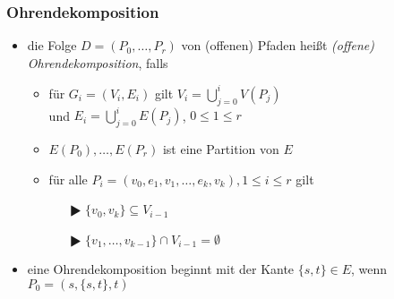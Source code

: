 \subsubsection{Ohrendekomposition}
\begin{minipage}{0.3\textwidth}
	
\end{minipage}
\begin{minipage}{0.65\textwidth}
	\begin{itemize}[itemsep=-1pt]
		\item die Folge $D=(P_0,\dots,P_r)$ von (offenen) Pfaden heißt \textit{(offene) Ohrendekomposition}, falls
			\begin{itemize}[itemsep=-1pt]
				\item für $G_i=(V_i,E_i)$ gilt $V_i=\bigcup\limits_{j=0}^{i}V(P_j)$\\
				und $E_i=\bigcup\limits_{j=0}^{i}E(P_j)$, $0\leq 1\leq r$
				\item $E(P_0),\dots,E(P_r)$ ist eine Partition von $E$
				\item für alle $P_i=(v_0,e_1,v_1,\dots,e_k,v_k), 1\leq i\leq r$ gilt
					\begin{itemize}
						\item[$\RHD$] $\{v_0,v_k\}\subseteq V_{i-1}$
						\item[$\RHD$] $\{v_1,\dots,v_{k-1}\}\cap V_{i-1}=\emptyset$
					\end{itemize}
			\end{itemize}
		\item eine Ohrendekomposition beginnt mit der Kante $\{s,t\}\in E$, wenn $P_0=(s,\{s,t\},t)$
	\end{itemize}
\end{minipage}
\vspace*{-\baselineskip}
